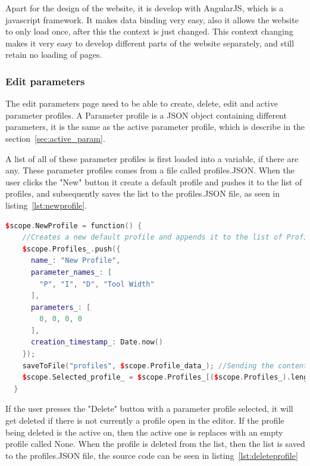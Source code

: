 Apart for the design of the website, it is develop with AngularJS\cite{angular}, which is a javascript framework. It makes data binding very easy, also it allows the website to only load once, after this the context is just changed. This context changing makes it very easy to develop different parts of the website separately, and still retain no loading of pages.

\subsubsection{Edit parameters}
The edit parameters page need to be able to create, delete, edit and active parameter profiles. A Parameter profile is a JSON object containing different parameters, it is the same as the active parameter profile, which is describe in the section~\ref{sec:active_param}.

A list of all of these parameter profiles is first loaded into a variable, if there are any. These parameter profiles comes from a file called profiles.JSON. When the user clicks the "New" button it create a default profile and pushes it to the list of profiles, and subsequently saves the list to the profiles.JSON file, as seen in listing~\ref{lst:newprofile}. 

\begin{lstlisting}[caption = {NewProfile function in editParam.js}, captionpos=b, label={lst:newprofile}, language=C++,firstnumber=1]
 $scope.NewProfile = function() {
    //Creates a new default profile and appends it to the list of Profiles_
    $scope.Profiles_.push({
      name_: "New Profile",
      parameter_names_: [
        "P", "I", "D", "Tool Width"
      ],
      parameters_: [
        0, 0, 0, 0
      ],
      creation_timestamp_: Date.now()
    });
    saveToFile("profiles", $scope.Profile_data_); //Sending the content to the server to get saved.
    $scope.Selected_profile_ = $scope.Profiles_[($scope.Profiles_).length - 1]; // Selects the new profile in the ui
  }
\end{lstlisting}

If the user presses the "Delete" button with a parameter profile selected, it will get deleted if there is not currently a profile open in the editor. If the profile being deleted is the active on, then the active one is replaces with an empty profile called None. When the profile is deleted from the list, then the list is saved to the profiles.JSON file, the source code can be seen in listing~\ref{lst:deleteprofile}

